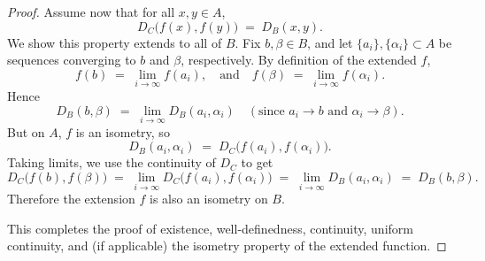 \documentclass[12pt]{article}
\theoremstyle{definition} %
\theoremstyle{plain} %
\begin{document}
\begin{proof}
    Assume now that for all $x,y \in A$,
    \[
    D_C\bigl(f(x),f(y)\bigr) \;=\; D_B(x,y).
    \]
    We show this property extends to all of $B$. Fix $b,\beta \in B$, and let $\{a_i\}, \{\alpha_i\} \subset A$ be sequences converging to $b$ and $\beta$, respectively. By definition of the extended $f$,
    \[
    f(b) \;=\; \lim_{i\to\infty} f(a_i), 
    \quad\text{and}\quad
    f(\beta) \;=\; \lim_{i\to\infty} f(\alpha_i).
    \]
    Hence
    \[
    D_B(b,\beta) 
    \;=\; \lim_{i\to\infty} D_B(a_i,\alpha_i)
    \quad (\text{since } a_i \to b \text{ and } \alpha_i \to \beta).
    \]
    But on $A$, $f$ is an isometry, so
    \[
    D_B(a_i,\alpha_i) 
    \;=\; D_C\bigl(f(a_i),f(\alpha_i)\bigr).
    \]
    Taking limits, we use the continuity of $D_C$ to get
    \[
    D_C\bigl(f(b),f(\beta)\bigr)
    \;=\; \lim_{i\to\infty} D_C\bigl(f(a_i),f(\alpha_i)\bigr)
    \;=\; \lim_{i\to\infty} D_B(a_i,\alpha_i)
    \;=\; D_B(b,\beta).
    \]
    Therefore the extension $f$ is also an isometry on $B$.
    
    \medskip
    
    This completes the proof of existence, well-definedness, continuity, uniform continuity, and (if applicable) the isometry property of the extended function.
    \end{proof}
    
\end{document}
